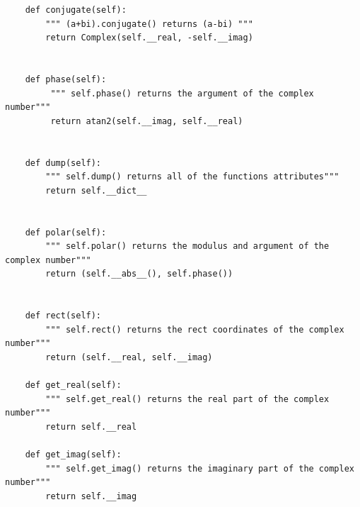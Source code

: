 \documentclass{article}
\begin{document}
\begin{lstlisting}
    def conjugate(self):
        """ (a+bi).conjugate() returns (a-bi) """
        return Complex(self.__real, -self.__imag)


    def phase(self):
         """ self.phase() returns the argument of the complex number"""
         return atan2(self.__imag, self.__real)


    def dump(self):
        """ self.dump() returns all of the functions attributes"""
        return self.__dict__


    def polar(self):
        """ self.polar() returns the modulus and argument of the complex number"""
        return (self.__abs__(), self.phase())


    def rect(self):
        """ self.rect() returns the rect coordinates of the complex number"""
        return (self.__real, self.__imag)

    def get_real(self):
        """ self.get_real() returns the real part of the complex number"""
        return self.__real

    def get_imag(self):
        """ self.get_imag() returns the imaginary part of the complex number"""
        return self.__imag
\end{lstlisting}
\end{document}
